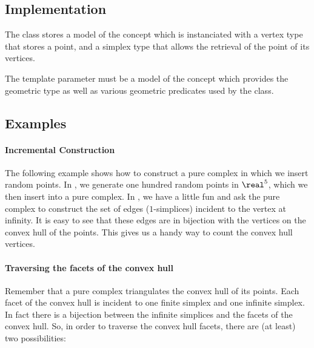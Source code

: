 {{%

\subsection{Implementation}

The class  stores a model 
of the concept  which is instanciated with a
vertex type that stores a point, and a simplex type that allows the retrieval
of the point of its vertices.

The template parameter  must be a model of the concept
 which provides the geometric  type as well
as various geometric predicates used by the  class.


\subsection{Examples}

\paragraph{Incremental Construction}

The following example shows how to construct a pure complex in which we insert
random points. In , we generate one hundred random points in
$\real^5$, which we then insert into a pure complex. In , we have
a little fun and ask the pure complex to construct the set of edges
($1$-simplices) incident to the vertex at infinity. It is easy to see that
these edges are in bijection with the vertices on the convex hull of the
points. This gives us a handy way to count the convex hull vertices.


\paragraph{Traversing the facets of the convex hull}

Remember that a pure complex triangulates the convex hull of its points. Each
facet of the convex hull is incident to one finite simplex and one infinite
simplex. In fact there is a bijection between the infinite simplices and the
facets of the convex hull. So, in order to traverse the convex hull facets,
there are (at least) two possibilities:

}}
